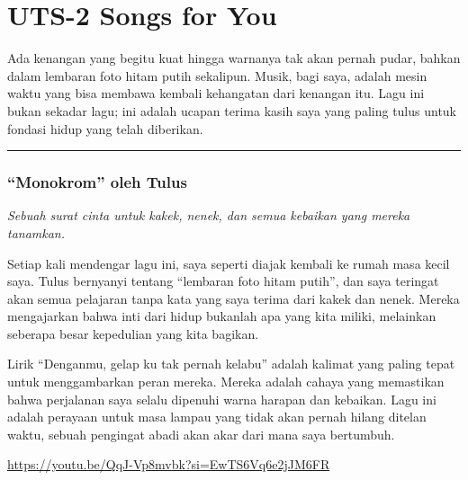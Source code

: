 \documentclass[
  letterpaper,
  DIV=11,
  numbers=noendperiod]{scrreprt}
\begin{document}

\chapter{UTS-2 Songs for You}\label{uts-2-songs-for-you}

Ada kenangan yang begitu kuat hingga warnanya tak akan pernah pudar,
bahkan dalam lembaran foto hitam putih sekalipun. Musik, bagi saya,
adalah mesin waktu yang bisa membawa kembali kehangatan dari kenangan
itu. Lagu ini bukan sekadar lagu; ini adalah ucapan terima kasih saya
yang paling tulus untuk fondasi hidup yang telah diberikan.

\begin{center}\rule{0.5\linewidth}{0.5pt}\end{center}

\subsection{``Monokrom'' oleh Tulus}\label{monokrom-oleh-tulus}

\emph{Sebuah surat cinta untuk kakek, nenek, dan semua kebaikan yang
mereka tanamkan.}

Setiap kali mendengar lagu ini, saya seperti diajak kembali ke rumah
masa kecil saya. Tulus bernyanyi tentang ``lembaran foto hitam putih'',
dan saya teringat akan semua pelajaran tanpa kata yang saya terima dari
kakek dan nenek. Mereka mengajarkan bahwa inti dari hidup bukanlah apa
yang kita miliki, melainkan seberapa besar kepedulian yang kita bagikan.

Lirik ``Denganmu, gelap ku tak pernah kelabu'' adalah kalimat yang
paling tepat untuk menggambarkan peran mereka. Mereka adalah cahaya yang
memastikan bahwa perjalanan saya selalu dipenuhi warna harapan dan
kebaikan. Lagu ini adalah perayaan untuk masa lampau yang tidak akan
pernah hilang ditelan waktu, sebuah pengingat abadi akan akar dari mana
saya bertumbuh.

\url{https://youtu.be/QqJ-Vp8mvbk?si=EwTS6Vq6e2jJM6FR}
\end{document}
